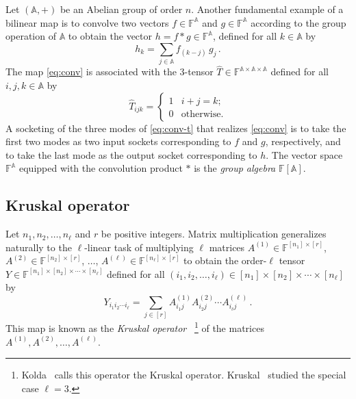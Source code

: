 \documentclass[11pt]{article}
\numberwithin{equation}{section}
\theoremstyle{definition}
\theoremstyle{plain}
\newcommand{\F}{\ensuremath{\mathbb{F}}}
\begin{document}
Let $(\mathbb{A},+)$ be an Abelian group of order $n$.
Another fundamental example of a bilinear map is to convolve
two vectors $f\in\F^{\mathbb{A}}$ and $g\in\F^{\mathbb{A}}$ according to the
group operation of $\mathbb{A}$ to obtain
the vector $h=f*g\in\F^{\mathbb{A}}$, defined for all $k\in \mathbb{A}$ by
\begin{equation}
\label{eq:conv}
h_k=\sum_{j\in \mathbb{A}}f_{(k-j)}\,g_j\,.
\end{equation}
The map \eqref{eq:conv} is associated with the $3$-tensor
$\hat{T}\in\F^{\mathbb{A}\times\mathbb{A}\times\mathbb{A}}$ defined for all
$i,j,k\in \mathbb{A}$ by
\begin{equation}
\label{eq:conv-t}
\hat{T}_{ijk}=
\begin{cases}
1 & \text{$i+j=k$};\\
0 & \text{otherwise}.
\end{cases}
\end{equation}
A socketing of the three modes of \eqref{eq:conv-t} that
realizes \eqref{eq:conv}
is to take the first two modes as two input sockets corresponding
to $f$ and $g$, respectively, and to take the last mode as the
output socket corresponding to $h$. The vector space
%
%
$\F^{\mathbb{A}}$  %
equipped with the convolution product $*$ is the
\emph{group algebra} $\F[\mathbb{A}]$.


\subsection{Kruskal operator}
\label{sect:kruskal}

Let $n_1,n_2,\ldots,n_\ell$ and $r$ be positive integers.
Matrix multiplication generalizes naturally to the $\ell$-linear task
of multiplying $\ell$ matrices
$A^{(1)}\in\F^{[n_1]\times [r]}$,
$A^{(2)}\in\F^{[n_2]\times [r]}$,
$\ldots$,
$A^{(\ell)}\in\F^{[n_\ell]\times [r]}$
to obtain the order-$\ell$ tensor
$Y\in\F^{[n_1]\times [n_2]\times \cdots\times [n_\ell]}$
defined for all
$(i_1,i_2,\ldots,i_\ell)\in[n_1]\times[n_2]\times\cdots\times[n_\ell]$ by
\begin{equation}
\label{eq:kruskal}
Y_{i_1i_2\cdots i_\ell}
=\sum_{j\in [r]} A^{(1)}_{i_1j}A^{(2)}_{i_2j}\cdots A^{(\ell)}_{i_\ell j}\,.
\end{equation}
%
%
%
This map 
%
is known as the \emph{Kruskal operator}~\cite{Kruskal1977,Kolda2006}%
\footnote{Kolda~\cite{Kolda2006} calls this operator the Kruskal operator.
Kruskal~\cite{Kruskal1977} studied %
%
%
%
the special case $\ell = 3$.}{}
%
of the matrices $A^{(1)},A^{(2)},\ldots,A^{(\ell)}$.
\end{document}
